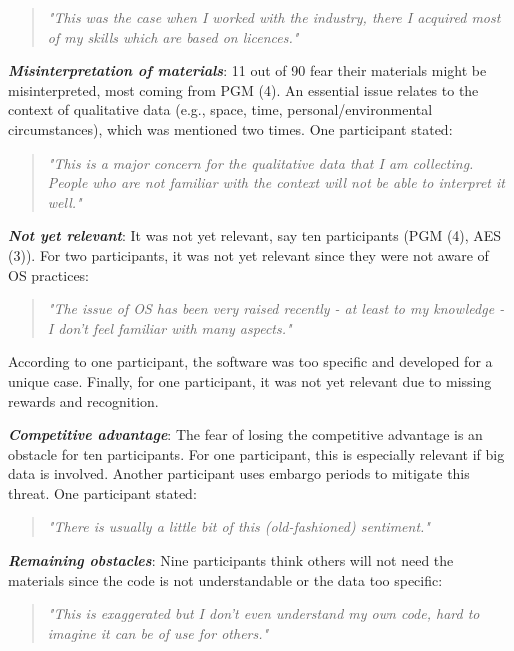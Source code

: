 \documentclass[gc, manuscript]{copernicus}
\begin{document}
\begin{quote}
\textit{"This was the case when I worked with the industry, there I acquired most of my skills which are based on licences."}
\end{quote}

\textit{\textbf{Misinterpretation of materials}}: 11 out of 90 fear
their materials might be misinterpreted, most coming from PGM (4). An
essential issue relates to the context of qualitative data (e.g., space,
time, personal/environmental circumstances), which was mentioned two
times. One participant stated:

\begin{quote}
\textit{"This is a major concern for the qualitative data that I am collecting. People who are not familiar with the context will not be able to interpret it well."}
\end{quote}

\textit{\textbf{Not yet relevant}}: It was not yet relevant, say ten
participants (PGM (4), AES (3)). For two participants, it was not yet
relevant since they were not aware of OS practices:

\begin{quote}
\textit{"The issue of OS has been very raised recently - at least to my knowledge - I don't feel familiar with many aspects."}
\end{quote}

According to one participant, the software was too specific and
developed for a unique case. Finally, for one participant, it was not
yet relevant due to missing rewards and recognition.

\textit{\textbf{Competitive advantage}}: The fear of losing the
competitive advantage is an obstacle for ten participants. For one
participant, this is especially relevant if big data is involved.
Another participant uses embargo periods to mitigate this threat. One
participant stated:

\begin{quote}
\textit{"There is usually a little bit of this (old-fashioned) sentiment."}
\end{quote}

\textit{\textbf{Remaining obstacles}}: Nine participants think others
will not need the materials since the code is not understandable or the
data too specific:

\begin{quote}
\textit{"This is exaggerated but I don't even understand my own code, hard to imagine it can be of use for others."}
\end{quote}
\end{document}
